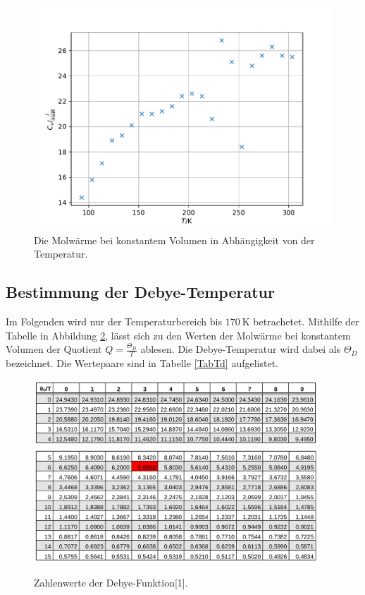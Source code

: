 \begin{figure}
  \centering
  \includegraphics{cv.pdf}
  \caption{Die Molwärme bei konstantem Volumen in Abhängigkeit von der Temperatur.}
  \label{fig:cv}
\end{figure}
\FloatBarrier






\subsection{Bestimmung der Debye-Temperatur}

Im Folgenden wird nur der Temperaturbereich bis $\SI{170}{\kelvin}$ betrachetet. 
Mithilfe der Tabelle in Abbildung \ref{fig:Td}, lässt sich zu den Werten der Molwärme bei konstantem Volumen
der Quotient $Q=\frac{\Theta_{\si{D}}}{T}$ ablesen. Die Debye-Temperatur wird dabei als $\Theta_{\si{D}}$ 
bezeichnet. Die Wertepaare sind in Tabelle \ref{TabTd} aufgelistet.
 
\begin{figure}
  \centering
  \includegraphics[width=0.95\textwidth]{Td1.png}
  \includegraphics[width=0.95\textwidth]{Td2.png}
  \caption{Zahlenwerte der Debye-Funktion[1].}
  \label{fig:Td}
\end{figure}


